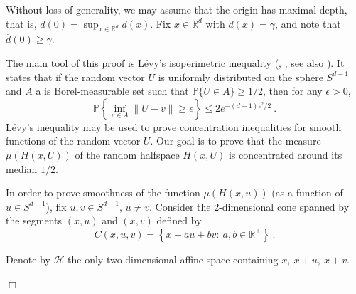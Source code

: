 \documentclass[12pt]{article}
\newcommand{\R}{\mathbb{R}}
\newcommand{\ol}{\overline}
\newcommand{\field}[1]{\mathbb{#1}}
\newcommand{\PROB}{\field{P}}
\newcommand{\qed}{\hfill $\Box$}
\newenvironment{proof}{\par\noindent{\bf Proof:}}{\qed \par\medskip\noindent}
\begin{document}
\begin{proof}
  Without loss of generality, we may assume that the origin has maximal depth, that is,
  $\ol{d}(0)=\sup_{x\in \R^d}\ol{d}(x)$. Fix $x\in \R^d$ with $\ol{d}(x)= \gamma$, and note that $\ol{d}(0)\geq \gamma$.
  
The main tool of this proof is L\'evy's isoperimetric inequality (\cite{Sch48}, \cite{Lev51}, see also \cite{ledoux2001concentration}). It states that if the random vector $U$ is uniformly distributed on the sphere
  $S^{d-1}$ and $A$ a is Borel-measurable set such that $\PROB\{U\in
  A\} \geq 1/2$, then for any $\epsilon>0$,
\begin{equation}\label{eq:LevyTheorem}
\PROB\left\{ \inf_{v\in A} \|U-v\| \geq \epsilon \right\} \leq 2e^{-(d-1)\epsilon^2/2}~.
\end{equation}
L\'evy's inequality may be used to prove concentration inequalities for smooth functions of
the random vector $U$. Our goal is to prove that the measure $\mu(H(x,U))$ of the random halfspace
$H(x,U)$ is concentrated around its median $1/2$.

In order to prove smoothness of the function $\mu(H(x,u))$ (as a function of $u\in S^{d-1}$), 
fix $u,v\in S^{d-1}$, $u\neq v$. Consider the $2$-dimensional cone spanned by the segments $(x,u)$ and $(x,v)$
defined by
\[
  C(x,u,v)=\left\{x +  a u+b v: \ a,b \in \R^+  \right\}~.
\]




Denote by $\mathcal{H}$ the only two-dimensional affine space
containing $x, \ x+u, \ x+v$.


\end{proof}
\end{document}
